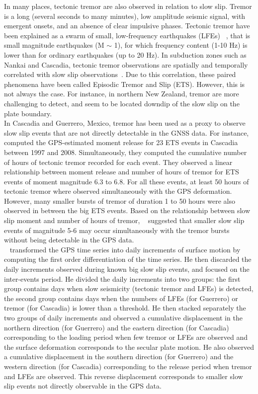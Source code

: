\documentclass[draft]{agujournal2018}
\begin{document}
In many places, tectonic tremor are also observed in relation to slow slip. Tremor is a long (several seconds to many minutes), low amplitude seismic signal, with emergent onsets, and an absence of clear impulsive phases. Tectonic tremor have been explained as a swarm of small, low-frequency earthquakes (LFEs) ~\citep{SHE_2007_nature}, that is small magnitude earthquakes (M $\sim$ 1), for which frequency content (1-10 Hz) is lower than for ordinary earthquakes (up to 20 Hz). In subduction zones such as Nankai and Cascadia, tectonic tremor observations are spatially and temporally correlated with slow slip observations~\citep{OBA_2002,ROG_2003}. Due to this correlation, these paired phenomena have been called Episodic Tremor and Slip (ETS). However, this is not always the case. For instance, in northern New Zealand, tremor are more challenging to detect, and seem to be located downdip of the slow slip on the plate boundary. \\

In Cascadia and Guerrero, Mexico, tremor has been used as a proxy to observe slow slip events that are not directly detectable in the GNSS data. For instance, ~\citet{AGU_2009} computed the GPS-estimated moment release for 23 ETS events in Cascadia between 1997 and 2008. Simultaneously, they computed the cumulative number of hours of tectonic tremor recorded for each event. They observed a linear relationship between moment release and number of hours of tremor for ETS events of moment magnitude 6.3 to 6.8. For all these events, at least 50 hours of tectonic tremor where observed simultaneously with the GPS deformation. However, many smaller bursts of tremor of duration 1 to 50 hours were also observed in between the big ETS events. Based on the relationship between slow slip moment and number of hours of tremor, ~\citet{AGU_2009} suggested that smaller slow slip events of magnitude 5-6 may occur simultaneously with the tremor bursts without being detectable in the GPS data. \\

~\citet{FRA_2016} transformed the GPS time series into daily increments of surface motion by computing the first order differentiation of the time series. He then discarded the daily increments observed during known big slow slip events, and focused on the inter-events period. He divided the daily increments into two groups: the first group contains days when slow seismicity (tectonic tremor and LFEs) is detected, the second group contains days when the numbers of LFEs (for Guerrero) or tremor (for Cascadia) is lower than a threshold. He then stacked separately the two groups of daily increments and observed a cumulative displacement in the northern direction (for Guerrero) and the eastern direction (for Cascadia) corresponding to the loading period when few tremor or LFEs are observed and the surface deformation corresponds to the secular plate motion. He also observed a cumulative displacement in the southern direction (for Guerrero) and the western direction (for Cascadia) corresponding to the release period when tremor and LFEs are observed. This reverse displacement corresponds to smaller slow slip events not directly observable in the GPS data.  \\
\end{document}
